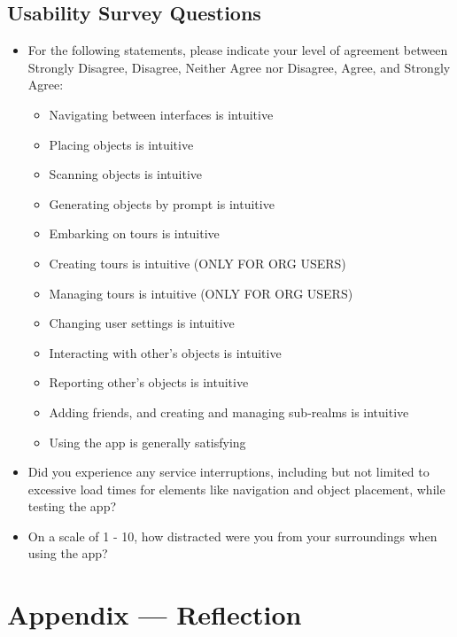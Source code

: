 \documentclass[12pt, titlepage]{article}
\begin{document}
\begin{enumerate}
\subsection{Usability Survey Questions} \label{sub:usability_survey}

\begin{itemize}
    \item For the following statements, please indicate your level of agreement between Strongly Disagree, Disagree, Neither Agree nor Disagree, Agree, and Strongly Agree:
    \begin{itemize}
        \item Navigating between interfaces is intuitive
        \item Placing objects is intuitive
        \item Scanning objects is intuitive
        \item Generating objects by prompt is intuitive
        \item Embarking on tours is intuitive
        \item Creating tours is intuitive (ONLY FOR ORG USERS)
        \item Managing tours is intuitive (ONLY FOR ORG USERS)
        \item Changing user settings is intuitive
        \item Interacting with other's objects is intuitive
        \item Reporting other's objects is intuitive
        \item Adding friends, and creating and managing sub-realms is intuitive
        \item Using the app is generally satisfying
    \end{itemize}
    \item Did you experience any service interruptions, including but not limited to excessive load times for elements like navigation and object placement, while testing the app? \\
    \item On a scale of 1 - 10, how distracted were you from your surroundings when using the app?
\end{itemize}

\newpage{}
\section*{Appendix --- Reflection}



\end{enumerate}
\end{document}
